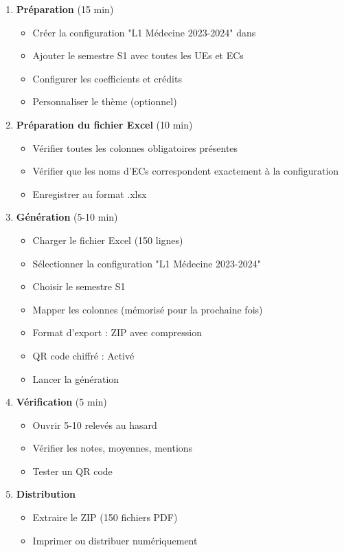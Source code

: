 \begin{enumerate}[leftmargin=*]
    \item \textbf{Préparation} (15 min)
    \begin{itemize}
        \item Créer la configuration "L1 Médecine 2023-2024" dans 
        \item Ajouter le semestre S1 avec toutes les UEs et ECs
        \item Configurer les coefficients et crédits
        \item Personnaliser le thème (optionnel)
    \end{itemize}

    \item \textbf{Préparation du fichier Excel} (10 min)
    \begin{itemize}
        \item Vérifier toutes les colonnes obligatoires présentes
        \item Vérifier que les noms d'ECs correspondent exactement à la configuration
        \item Enregistrer au format .xlsx
    \end{itemize}

    \item \textbf{Génération} (5-10 min)
    \begin{itemize}
        \item Charger le fichier Excel (150 lignes)
        \item Sélectionner la configuration "L1 Médecine 2023-2024"
        \item Choisir le semestre S1
        \item Mapper les colonnes (mémorisé pour la prochaine fois)
        \item Format d'export : ZIP avec compression
        \item QR code chiffré : Activé
        \item Lancer la génération
    \end{itemize}

    \item \textbf{Vérification} (5 min)
    \begin{itemize}
        \item Ouvrir 5-10 relevés au hasard
        \item Vérifier les notes, moyennes, mentions
        \item Tester un QR code
    \end{itemize}

    \item \textbf{Distribution}
    \begin{itemize}
        \item Extraire le ZIP (150 fichiers PDF)
        \item Imprimer ou distribuer numériquement
    \end{itemize}
\end{enumerate}

